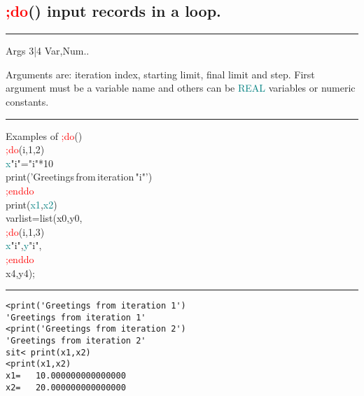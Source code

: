 \subsection{\textcolor{Red}{;do}() input records in a loop.} 
\label{inpudo} 
\vspace{0.3cm} 
\hrule 
\vspace{0.3cm} 
\noindent Args \tabto{3cm} 3|4 \tabto{5cm}  Var,Num.. \tabto{7cm} 
\begin{changemargin}{3cm}{0cm} 
\noindent Arguments are: iteration index, starting limit, 
final limit and step. First argument must be a variable name and others 
can be \textcolor{teal}{REAL} variables or numeric constants. 
\end {changemargin} 
\hrule 
\vspace{0.2cm} 
\singlespacing 
\begin{example}[inpudoex]Examples of \textcolor{Red}{;do}()\\ 
\label{inpudoex} 
\noindent \textcolor{Red}{;do}(i,1,2)\\ 
\textcolor{teal}{x}"i"="i"*10\\ 
\textcolor{VioletRed}{print}('Greetings\,from\,iteration\,"i"')\\ 
\textcolor{Red}{;enddo}\\ 
\textcolor{VioletRed}{print}(\textcolor{teal}{x1},\textcolor{teal}{x2})\\ 
varlist=\textcolor{VioletRed}{list}(x0,y0,\\ 
\textcolor{Red}{;do}(i,1,3)\\ 
\textcolor{teal}{x}"i",\textcolor{teal}{y}"i",\\ 
\textcolor{Red}{;enddo}\\ 
x4,y4);\\ 
\end{example} 
\vspace{-7mm} \rule{5cm}{0.1pt} 
\onehalfspacing 
 
\color{Green} 
\begin{verbatim} 
<print('Greetings from iteration 1') 
'Greetings from iteration 1' 
<print('Greetings from iteration 2') 
'Greetings from iteration 2' 
sit< print(x1,x2) 
<print(x1,x2) 
x1=   10.000000000000000 
x2=   20.000000000000000 
\end{verbatim} 
\color{Black} 
